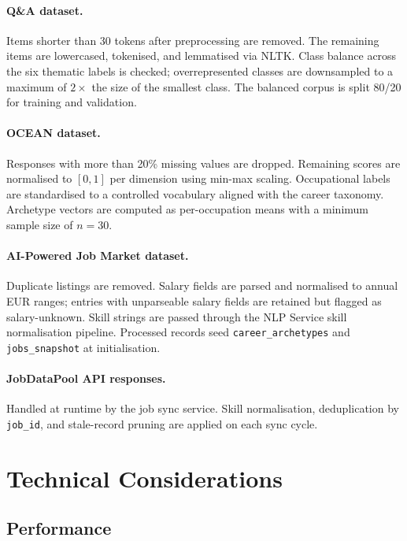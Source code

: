 \paragraph{Q\&A dataset.}
Items shorter than 30 tokens after preprocessing are removed. The remaining
items are lowercased, tokenised, and lemmatised via NLTK. Class balance across
the six thematic labels is checked; overrepresented classes are downsampled to
a maximum of $2\times$ the size of the smallest class. The balanced corpus is
split 80/20 for training and validation.

\paragraph{OCEAN dataset.}
Responses with more than 20\% missing values are dropped. Remaining scores are
normalised to $[0, 1]$ per dimension using min-max scaling. Occupational
labels are standardised to a controlled vocabulary aligned with the career
taxonomy. Archetype vectors are computed as per-occupation means with a minimum
sample size of $n = 30$.

\paragraph{AI-Powered Job Market dataset.}
Duplicate listings are removed. Salary fields are parsed and normalised to
annual EUR ranges; entries with unparseable salary fields are retained but
flagged as salary-unknown. Skill strings are passed through the NLP Service
skill normalisation pipeline. Processed records seed \texttt{career\_archetypes}
and \texttt{jobs\_snapshot} at initialisation.

\paragraph{JobDataPool API responses.}
Handled at runtime by the job sync service. Skill normalisation,
deduplication by \texttt{job\_id}, and stale-record pruning are applied on
each sync cycle.

\section{Technical Considerations}
\label{sec:technical}

\subsection{Performance}

